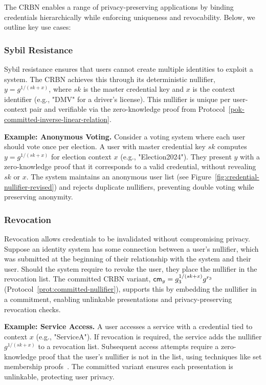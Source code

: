 The CRBN enables a range of privacy-preserving applications by binding credentials hierarchically while enforcing uniqueness and revocability. Below, we outline key use cases:

\subsubsection{Sybil Resistance}\label{subsubsec:sybil-resistance}
Sybil resistance ensures that users cannot create multiple identities to exploit a system. The CRBN achieves this through its deterministic nullifier, $y = g^{1/(sk + x)}$, where $sk$ is the master credential key and $x$ is the context identifier (e.g., "DMV" for a driver's license). This nullifier is unique per user-context pair and verifiable via the zero-knowledge proof from Protocol~\ref{pok-committed-inverse-linear-relation}.

\textbf{Example: Anonymous Voting.} Consider a voting system where each user should vote once per election. A user with master credential key $sk$ computes $y = g^{1/(sk + x)}$ for election context $x$ (e.g., "Election2024"). They present $y$ with a zero-knowledge proof that it corresponds to a valid credential, without revealing $sk$ or $x$. The system maintains an anonymous user list (see Figure~\ref{fig:credential-nullifier-revised}) and rejects duplicate nullifiers, preventing double voting while preserving anonymity.

\subsubsection{Revocation}\label{subsubsec:revocation}
Revocation allows credentials to be invalidated without compromising privacy. Suppose an identity system has some connection between a user's nullifier, which was submitted at the beginning of their relationship with the system and their user. Should the system require to revoke the user, they place the nullifier in the revocation list. The committed CRBN variant, $\mathsf{cm}_y = g_3^{1/(sk + x)} g^{r_3}$ (Protocol~\ref{prot:committed-nullifier}), supports this by embedding the nullifier in a commitment, enabling unlinkable presentations and privacy-preserving revocation checks.

\textbf{Example: Service Access.} A user accesses a service with a credential tied to context $x$ (e.g., "ServiceA"). If revocation is required, the service adds the nullifier $g^{1/(sk + x)}$ to a revocation list. Subsequent access attempts require a zero-knowledge proof that the user’s nullifier is not in the list, using techniques like set membership proofs~\cite{goos_dynamic_2002}. The committed variant ensures each presentation is unlinkable, protecting user privacy.

